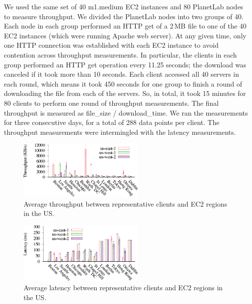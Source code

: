 We used the same set of 40 m1.med\-ium EC2 instances and 80 PlanetLab nodes to
measure throughput. We divided the PlanetLab nodes into
two groups of 40. Each node in each group performed an HTTP get of
a 2\,MB file to one of the 40 EC2 instances (which were running Apache web
server). At any given time, only one HTTP connection was
established with each EC2 instance to avoid contention across
throughput measurements. In particular, the
clients in each group performed an HTTP get operation every 11.25
seconds; the download was canceled if it took more than 10 seconds.
Each client accessed all 40 servers in each round, which means it took
450 seconds for one group to finish a round of downloading the file
from each of the servers.  So, in total, it took 15 minutes for
80 clients to perform one round of throughput measurements.
The final throughput is measured as file\_size / download\_time.
We ran the measurements for three consecutive days, 
for a total of 288 data points per client. The throughput measurements
were intermingled with the latency measurements.


\begin{figure}[t]
\centering
\includegraphics[width=0.55\textwidth]{./figures/cloudmeasure/imag_sec5/region_bandwidth.pdf}
\caption{Average throughput between representative clients and EC2 regions in the US.}
\label{fig:region_bandwidth}
\end{figure}

\begin{figure}[t]
\centering
\includegraphics[width=0.55\textwidth]{./figures/cloudmeasure/imag_sec5/region_latency.pdf}
\caption{Average latency between representative clients and EC2 regions in the US.}
\label{fig:region_latency}
\end{figure}


